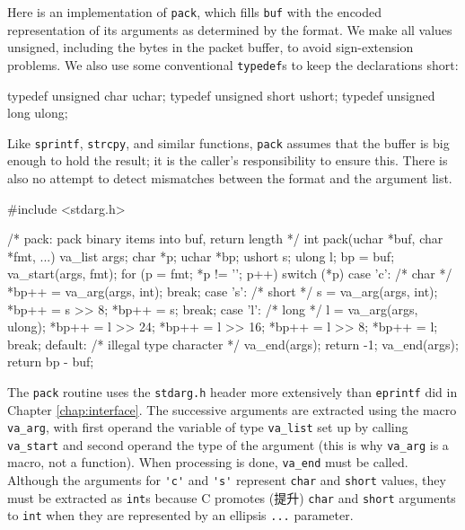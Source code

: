 Here is an implementation of \verb'pack', which fills \verb'buf' with the
encoded representation of its arguments as determined by the format. We
make all values unsigned, including the bytes in the packet buffer, to
avoid sign-extension problems.  We also use some conventional
\verb'typedef's to keep the declarations short:
\begin{wellcode}
    typedef unsigned char   uchar;
    typedef unsigned short  ushort;
    typedef unsigned long   ulong;
\end{wellcode}
Like \verb'sprintf', \verb'strcpy', and similar functions, \verb'pack'
assumes that the buffer is big enough to hold the result; it is the
caller's responsibility to ensure this. There is also no attempt to detect
mismatches between the format and the argument list.
\begin{wellcode}
    #include <stdarg.h>

    /* pack: pack binary items into buf, return length */
    int pack(uchar *buf, char *fmt, ...)
    {
        va_list args;
        char    *p;
        uchar   *bp;
        ushort  s;
        ulong   l;
        bp = buf;
        va_start(args, fmt);
        for (p = fmt; *p != '\0'; p++) {
            switch (*p) {
            case 'c':   /* char */
                *bp++ = va_arg(args, int);
                break;
            case 's':   /* short */
                s = va_arg(args, int);
                *bp++ = s >> 8;
                *bp++ = s;
                break;
            case 'l':   /* long */
                l = va_arg(args, ulong);
                *bp++ = l >> 24;
                *bp++ = l >> 16;
                *bp++ = l >> 8;
                *bp++ = l;
                break;
            default:    /* illegal type character */
                va_end(args);
                return -1;
            }
        }
        va_end(args);
        return bp - buf;
    }
\end{wellcode}

The \verb'pack' routine uses the \verb'stdarg.h' header more extensively
than \verb'eprintf' did in Chapter \ref{chap:interface}. The successive
arguments are extracted using the macro \verb'va_arg', with first operand
the variable of type \verb'va_list' set up by calling \verb'va_start' and
second operand the type of the argument (this is why \verb'va_arg' is a
macro, not a function).  When processing is done, \verb'va_end' must be
called. Although the arguments for \verb"'c'" and \verb"'s'" represent
\verb'char' and \verb'short' values, they must be extracted as \verb'int's
because C promotes (提升) \verb'char' and \verb'short' arguments to
\verb'int' when they are represented by an ellipsis \verb'...'  parameter.

